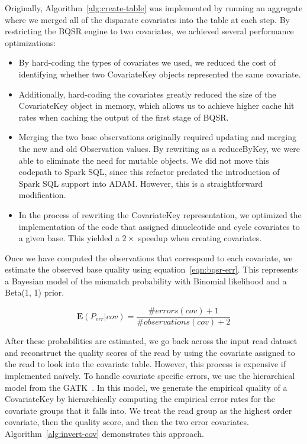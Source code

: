 \documentclass[phd]{ucbthesis}
\begin{document}
Originally, Algorithm~\ref{alg:create-table} was implemented by running an
aggregate where we merged all of the disparate covariates into the table at each
step. By restricting the BQSR engine to two covariates, we achieved several
performance optimizations:

\begin{itemize}
\item By hard-coding the types of covariates we used, we reduced the cost of
  identifying whether two {CovariateKey} objects represented the same
  covariate.
\item Additionally, hard-coding the covariates greatly reduced the size of the
  {CovariateKey} object in memory, which allows us to achieve higher
  cache hit rates when caching the output of the first stage of BQSR.
\item Merging the two base observations originally required
  updating and merging the new and old {Observation} values. By rewriting
  as a {reduceByKey}, we were able to eliminate the need for mutable
  objects. We did not move this codepath to {Spark SQL}, since this
  refactor predated the introduction of {Spark SQL} support into ADAM.
  However, this is a straightforward modification.
\item In the process of rewriting the {CovariateKey} representation, we
  optimized the implementation of the code that assigned dinucleotide and cycle
  covariates to a given base. This yielded a $2\times$ speedup when creating
  covariates.
\end{itemize}

Once we have computed the observations that correspond to each covariate, we
estimate the observed base quality using equation~\eqref{eqn:bqsr-err}. This
represents a Bayesian model of the mismatch probability with Binomial
likelihood and a Beta(1, 1) prior.

\begin{equation}
\label{eqn:bqsr-err}
\mathbf{E}(P_{err}|{cov}) = \frac{{\#errors}(cov) + 1}{{\#observations}(cov) + 2}
\end{equation}

After these probabilities are estimated, we go back across the input read
dataset and reconstruct the quality scores of the read by using the covariate
assigned to the read to look into the covariate table. However, this process is
expensive if implemented na\"{i}vely. To handle covariate specific errors, we
use the hierarchical model from the {GATK}~\cite{depristo11}. In this
model, we generate the empirical quality of a {CovariateKey} by
hierarchically computing the empirical error rates for the covariate
groups that it falls into. We treat the read group as the highest order
covariate, then the quality score, and then the two error covariates.
Algorithm~\ref{alg:invert-cov} demonstrates this approach.
\end{document}
